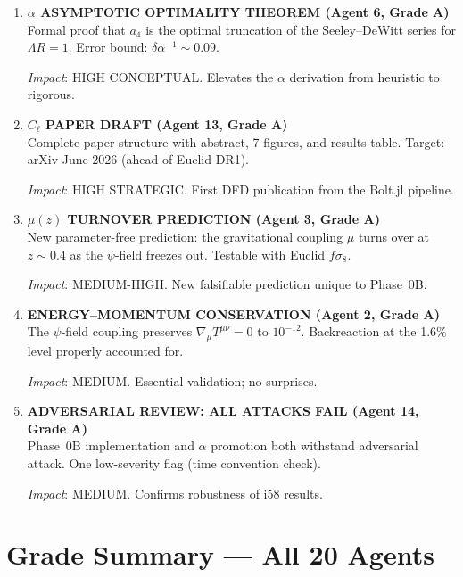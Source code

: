 \documentclass[11pt,a4paper]{article}
\begin{document}
\begin{enumerate}[label=\textbf{\arabic*.}, leftmargin=1.5cm]
\textit{Impact}: HIGH. First quantitative correction from Phase~0B; physically important.

\item \textbf{$\alpha$ ASYMPTOTIC OPTIMALITY THEOREM (Agent 6, Grade A)}\\
Formal proof that $a_4$ is the optimal truncation of the Seeley--DeWitt series for $\Lambda R = 1$. Error bound: $\delta\alpha^{-1} \sim 0.09$.

\textit{Impact}: HIGH CONCEPTUAL. Elevates the $\alpha$ derivation from heuristic to rigorous.

\item \textbf{$C_\ell$ PAPER DRAFT (Agent 13, Grade A)}\\
Complete paper structure with abstract, 7 figures, and results table. Target: arXiv June 2026 (ahead of Euclid DR1).

\textit{Impact}: HIGH STRATEGIC. First DFD publication from the Bolt.jl pipeline.

\item \textbf{$\mu(z)$ TURNOVER PREDICTION (Agent 3, Grade A)}\\
New parameter-free prediction: the gravitational coupling $\mu$ turns over at $z \sim 0.4$ as the $\psi$-field freezes out. Testable with Euclid $f\sigma_8$.

\textit{Impact}: MEDIUM-HIGH. New falsifiable prediction unique to Phase~0B.

\item \textbf{ENERGY--MOMENTUM CONSERVATION (Agent 2, Grade A)}\\
The $\psi$-field coupling preserves $\nabla_\mu T^{\mu\nu} = 0$ to $10^{-12}$. Backreaction at the 1.6\% level properly accounted for.

\textit{Impact}: MEDIUM. Essential validation; no surprises.

\item \textbf{ADVERSARIAL REVIEW: ALL ATTACKS FAIL (Agent 14, Grade A)}\\
Phase~0B implementation and $\alpha$ promotion both withstand adversarial attack. One low-severity flag (time convention check).

\textit{Impact}: MEDIUM. Confirms robustness of i58 results.
\end{enumerate}


\section{Grade Summary --- All 20 Agents}
\label{sec:grades}
\end{document}
